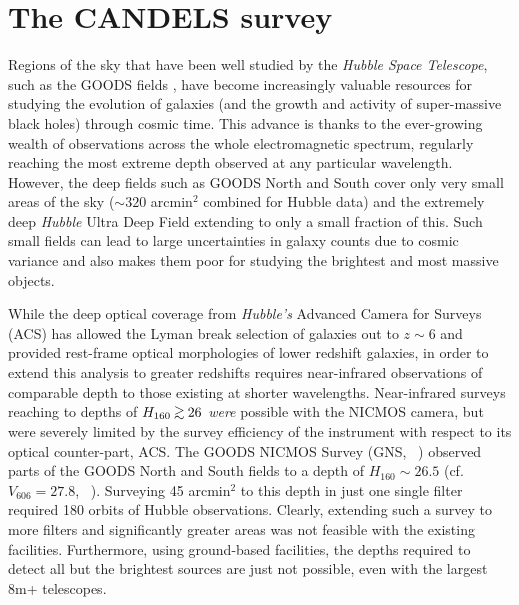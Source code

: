 \section{The CANDELS survey}\label{sec:intro-candels}
Regions of the sky that have been well studied by the \emph{Hubble Space Telescope}, such as the GOODS fields \citep{2004ApJ...600L..93G}, have become increasingly valuable resources for studying the evolution of galaxies (and the growth and activity of super-massive black holes) through cosmic time. This advance is thanks to the ever-growing wealth of observations across the whole electromagnetic spectrum, regularly reaching the most extreme depth observed at any particular wavelength. However, the deep fields such as GOODS North and South cover only very small areas of the sky ($\sim 320$ arcmin$^{2}$ combined for Hubble data) and the extremely deep \emph{Hubble} Ultra Deep Field extending to only a small fraction of this. Such small fields can lead to large uncertainties in galaxy counts due to cosmic variance and also makes them poor for studying the brightest and most massive objects.

While the deep optical coverage from \emph{Hubble's} Advanced Camera for Surveys (ACS) has allowed the Lyman break selection of galaxies out to $z\sim6$ and provided rest-frame optical morphologies of lower redshift galaxies, in order to extend this analysis to greater redshifts requires near-infrared observations of comparable depth to those existing at shorter wavelengths. Near-infrared surveys reaching to depths of $H_{160} \simgreat 26$ \emph{were} possible with the NICMOS camera, but were severely limited by the survey efficiency of the instrument with respect to its optical counter-part, ACS. The GOODS NICMOS Survey (GNS, \citeauthor{Conselice:2011ia}~\citeyear{Conselice:2011ia}) observed parts of the GOODS North and South fields to a depth of $H_{160} \sim 26.5$ (cf. $V_{606} = 27.8$, \citeauthor{2004ApJ...600L..93G}~\citeyear{2004ApJ...600L..93G}). Surveying 45 arcmin$^{2}$ to this depth in just one single filter required 180 orbits of Hubble observations. Clearly, extending such a survey to more filters and significantly greater areas was not feasible with the existing facilities. Furthermore, using ground-based facilities, the depths required to detect all but the brightest sources are just not possible, even with the largest 8m+ telescopes. 

